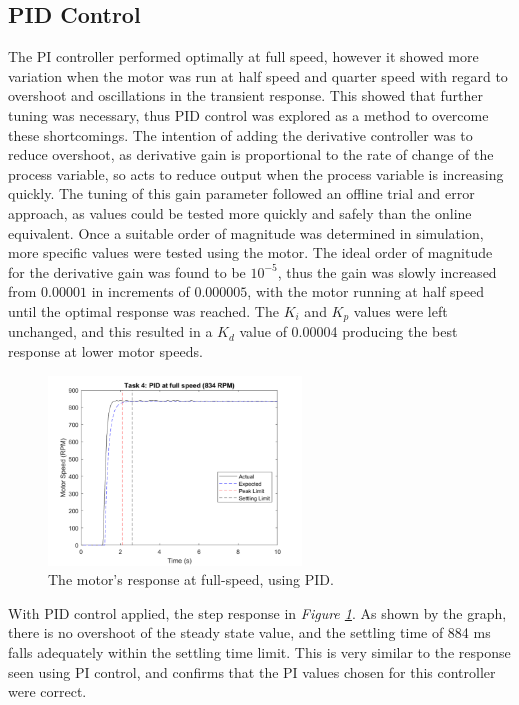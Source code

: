 \documentclass[11pt, onecolumn]{article}
\begin{document}
\subsection*{PID Control}
\par The PI controller performed optimally at full speed, however it showed more variation when the motor was run at half speed and quarter speed with regard to overshoot and oscillations in the transient response. This showed that further tuning was necessary, thus PID control was explored as a method to overcome these shortcomings. The intention of adding the derivative controller was to reduce overshoot, as derivative gain is proportional to the rate of change of the process variable, so acts to reduce output when the process variable is increasing quickly. The tuning of this gain parameter followed an offline trial and error approach, as values could be tested more quickly and safely than the online equivalent. Once a suitable order of magnitude was determined in simulation, more specific values were tested using the motor. The ideal order of magnitude for the derivative gain was found to be $10^{-5}$, thus the gain was slowly increased from $0.00001$ in increments of $0.000005$, with the motor running at half speed until the optimal response was reached. The $K_i$ and $K_p$ values were left unchanged, and this resulted in a $K_d$ value of 0.00004 producing the best response at lower motor speeds.
\begin{figure}[h!]
    \centering
    \includegraphics[width=0.6\textwidth]{q4-pid1.png}
    \caption{The motor's response at full-speed, using PID.}
    \label{fig:q4-pid1}
\end{figure}
\par With PID control applied, the step response in \textit{Figure \ref{fig:q4-pid1}}. As shown by the graph, there is no overshoot of the steady state value, and the settling time of 884 ms falls adequately within the settling time limit. This is very similar to the response seen using PI control, and confirms that the PI values chosen for this controller were correct.
\end{document}
